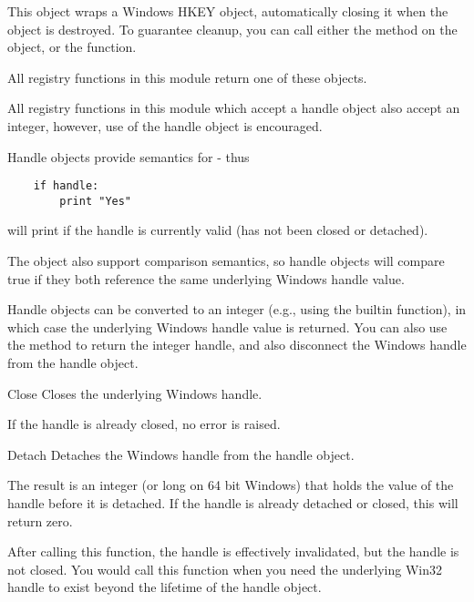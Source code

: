  This object wraps a Windows HKEY object, automatically closing it when
 the object is destroyed.  To guarantee cleanup, you can call either
 the  method on the object, or the 
  function.

 All registry functions in this module return one of these objects.

 All registry functions in this module which accept a handle object 
 also accept an integer, however, use of the handle object is 
 encouraged.
 
 Handle objects provide semantics for  - thus
\begin{verbatim}
    if handle:
        print "Yes"
\end{verbatim}
 will print  if the handle is currently valid (has not been
 closed or detached).

 The object also support comparison semantics, so handle
 objects will compare true if they both reference the same
 underlying Windows handle value.

 Handle objects can be converted to an integer (e.g., using the
 builtin  function), in which case the underlying
 Windows handle value is returned.  You can also use the 
  method to return the integer handle, and
 also disconnect the Windows handle from the handle object.

\begin{methoddesc}[PyHKEY]{Close}{}
  Closes the underlying Windows handle.

  If the handle is already closed, no error is raised.
\end{methoddesc}


\begin{methoddesc}[PyHKEY]{Detach}{}
  Detaches the Windows handle from the handle object.

 The result is an integer (or long on 64 bit Windows) that holds
 the value of the handle before it is detached.  If the
 handle is already detached or closed, this will return zero.

 After calling this function, the handle is effectively invalidated,
 but the handle is not closed.  You would call this function when 
 you need the underlying Win32 handle to exist beyond the lifetime 
 of the handle object.
\end{methoddesc}
